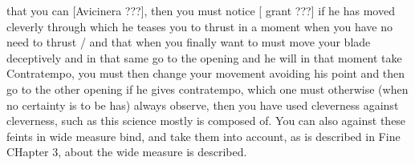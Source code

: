 \newpage


\newpage


that you can [Avicinera ???], then you must notice [ grant ???] if he
has moved cleverly through which he teases you to thrust in a moment
when you have no need to thrust / and that when you finally want to
must move your blade deceptively and in that same go to the opening
and he will in that moment take Contratempo, you must then change your
movement avoiding his point and then go to the other opening if he
gives contratempo, which one must otherwise (when no certainty is to be
has) always observe, then you have used cleverness against cleverness,
such as this science mostly is composed of. You can also against these
feints in wide measure bind, and take them into account, as is
described in Fine CHapter 3, about the wide measure is described.


